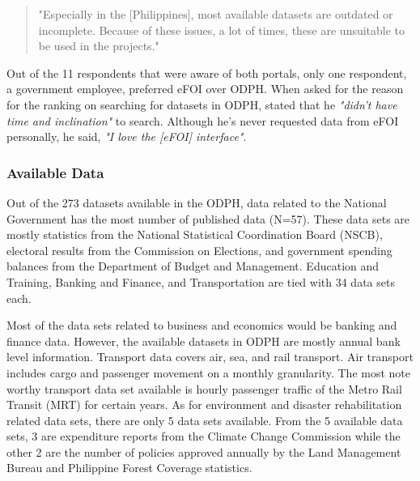 \documentclass{sigchi}
\begin{document}
\begin{quote}
    "Especially in the [Philippines], most available datasets are outdated or incomplete. Because of these issues, a lot of times, these are unsuitable to be used in the projects."
\end{quote}

Out of the 11 respondents that were aware of both portals, only one respondent, a government employee, preferred eFOI over ODPH. When asked for the reason for the ranking on searching for datasets in ODPH, stated that he \textit{"didn't have time and inclination"} to search. Although he's never requested data from eFOI personally, he said, \textit{"I love the [eFOI] interface"}. 

\subsubsection{Available Data}
Out of the 273 datasets available in the ODPH, data related to the National Government has the most number of published data (N=57). These data sets are mostly statistics from the National Statistical Coordination Board (NSCB), electoral results from the Commission on Elections, and government spending balances from the Department of Budget and Management. Education and Training, Banking and Finance, and Transportation are tied with 34 data sets each.

Most of the data sets related to business and economics would be banking and finance data. However, the available datasets in ODPH are mostly annual bank level information. Transport data covers air, sea, and rail transport. Air transport includes cargo and passenger movement on a monthly granularity. The most note worthy transport data set available is hourly passenger traffic of the Metro Rail Transit (MRT) for certain years. As for environment and disaster rehabilitation related data sets, there are only 5 data sets available. From the 5 available data sets, 3 are expenditure reports from the Climate Change Commission while the other 2 are the number of policies approved annually by the Land Management Bureau and Philippine Forest Coverage statistics.

\end{document}
